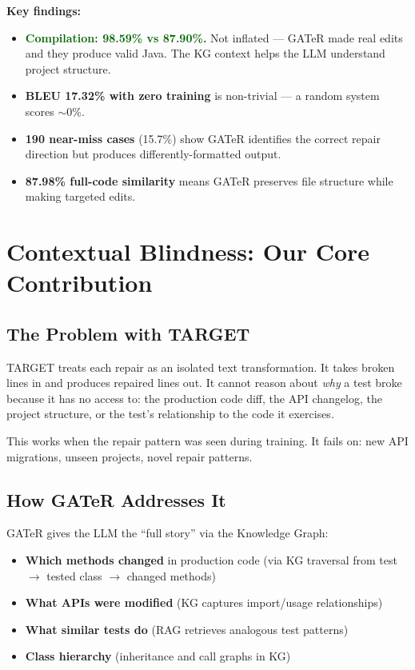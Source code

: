 \documentclass[11pt,a4paper]{article}
\begin{document}
\textbf{Key findings:}
\begin{itemize}[nosep,leftmargin=1.5em]
  \item \textcolor{darkgreen}{\textbf{Compilation: 98.59\% vs 87.90\%.}}
        Not inflated --- GATeR made real edits and they produce valid Java.
        The KG context helps the LLM understand project structure.
  \item \textbf{BLEU 17.32\% with zero training} is non-trivial ---
        a random system scores $\sim$0\%.
  \item \textbf{190 near-miss cases} (15.7\%) show GATeR identifies
        the correct repair direction but produces differently-formatted output.
  \item \textbf{87.98\% full-code similarity} means GATeR preserves
        file structure while making targeted edits.
\end{itemize}

\section{Contextual Blindness: Our Core Contribution}

\subsection{The Problem with TARGET}

TARGET treats each repair as an isolated text transformation.  It
takes broken lines in and produces repaired lines out.  It cannot
reason about \textit{why} a test broke because it has no access to:
the production code diff, the API changelog, the project structure,
or the test's relationship to the code it exercises.

This works when the repair pattern was seen during training.  It
fails on: new API migrations, unseen projects, novel repair patterns.

\subsection{How GATeR Addresses It}

GATeR gives the LLM the ``full story'' via the Knowledge Graph:

\begin{itemize}[nosep,leftmargin=1.5em]
  \item \textbf{Which methods changed} in production code (via KG
        traversal from test $\to$ tested class $\to$ changed methods)
  \item \textbf{What APIs were modified} (KG captures import/usage
        relationships)
  \item \textbf{What similar tests do} (RAG retrieves analogous
        test patterns)
  \item \textbf{Class hierarchy} (inheritance and call graphs in KG)
\end{itemize}
\end{document}
